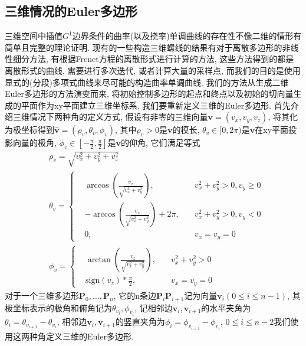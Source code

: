 \documentclass[utf8]{ctexart} %
\begin{document}
	 \subsection{三维情况的Euler多边形}
	 三维空间中插值$G^1$边界条件的曲率(以及挠率)单调曲线的存在性不像二维的情形有简单且完整的理论证明. 现有的一些构造三维螺线的结果有对于离散多边形的非线性细分方法, 有根据Frenet方程的离散形式进行计算的方法, 这些方法得到的都是离散形式的曲线, 需要进行多次迭代, 或者计算大量的采样点, 而我们的目的是使用显式的(分段)多项式曲线来尽可能的构造曲率单调曲线. 我们的方法从生成二维Euler多边形的方法演变而来, 将初始控制多边形的起点和终点以及初始的切向量生成的平面作为xy平面建立三维坐标系, 我们要重新定义三维的Euler多边形. 首先介绍三维情况下两种角的定义方式, 假设有非零的三维向量$\boldsymbol{v}=(v_x,v_y,v_z)$, 将其化为极坐标得到$\hat{\boldsymbol{v}}=(\rho_v,\theta_v,\phi_v)$, 其中$\rho_v>0$是$\boldsymbol{v}$的模长, $\theta_v\in[0,2\pi)$是$\boldsymbol{v}$在xy平面投影向量的极角, $\phi_v\in[-\frac{\pi}2,\frac{\pi}2]$是$\boldsymbol{v}$的仰角, 它们满足等式
	 \begin{equation}\label{angle_compute}
	 \begin{aligned}
	 &\rho_v = \sqrt{v_x^2+v_y^2+v_z^2}\\
	 &\theta_v =
	 \left\{
	 \begin{aligned}
	 &\arccos(\frac{v_x}{\sqrt{v_x^2+v_y^2}}),\quad &v_x^2+v_y^2>0, v_y\geq0\\
	 &-\arccos(\frac{v_x}{\sqrt{v_x^2+v_y^2}})+2\pi, \quad &v_x^2+v_y^2>0, v_y<0\\
	 &0, \quad &v_x=v_y=0
	 \end{aligned}
	 \right.\\
	 &\phi_v = \left\{
	 \begin{aligned}
	 &\arctan(\frac{v_z}{\sqrt{v_x^2+v_y^2}}),\quad &v_x^2+v_y^2>0\\
	 &\mathrm{sign}(v_z)*\frac{\pi}2,\quad &v_x=v_y=0
	 \end{aligned}
	 \right.
	 \end{aligned}
	 \end{equation} 对于一个三维多边形$\boldsymbol{P}_0,\dots,\boldsymbol{P}_n$, 它的n条边$\boldsymbol{P}_i\boldsymbol{P}_{i+1}$记为向量$\boldsymbol{v}_i(0\leq i\leq n-1)$, 其极坐标表示的极角和俯角记为$\theta_{v_i}, \phi_{v_i}$, 记相邻边$\boldsymbol{v}_i, \boldsymbol{v}_{i+1}$的水平夹角为$\theta_i = \theta_{v_{i+1}}-\theta_{v_i}$, 相邻边$\boldsymbol{v}_i, \boldsymbol{v}_{i+1}$的竖直夹角为$\phi_i = \phi_{v_{i+1}}-\phi_{v_i}$, $0\leq i\leq n-2$我们使用这两种角定义三维的Euler多边形.
\end{document}
